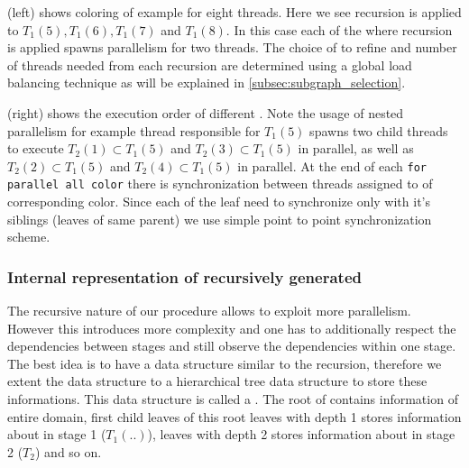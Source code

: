       (left) shows \DTWO coloring of \STEX example for eight threads. Here we see recursion is applied to \levelGroups $T_1(5),T_1(6),T_1(7)$ and $T_1(8)$. In this case each of the \levelGroups where recursion is applied spawns parallelism for two threads. The choice of \levelGroups to refine and number of threads needed from each recursion are determined using a global load balancing technique as will be explained in \cref{subsec:subgraph_selection}.
     
       (right) shows the execution order of different \levelGroups. Note the usage of nested parallelism \ie for example thread responsible for $T_1(5)$ spawns two child threads to execute $T_2(1) \subset T_1(5)$ and $T_2(3) \subset T_1(5)$ in parallel, as well as $T_2(2) \subset T_1(5)$ and $T_2(4) \subset T_1(5)$ in parallel. At the end of each {\tt for parallel all color} there is synchronization between threads assigned to \levelGroup of corresponding color. Since each of the leaf need to synchronize only with it's siblings (leaves of same parent)  we use simple point to point synchronization scheme. 
          
       
	\subsubsection{Internal representation of recursively generated \boldmath{\levelGroups}} \label{subsec:level_tree}
	The recursive nature of our procedure allows to exploit more parallelism. However this introduces more complexity and one has to additionally respect the dependencies between stages and still observe the dependencies within one stage. The best idea is to have a data structure similar to the recursion, therefore we extent the \levelPtr data structure to a hierarchical tree data structure to store these informations. This data structure is called a \levelTree. The root of \levelTree contains information of entire domain, first child leaves of this root \ie leaves with depth 1 stores information about \levelGroups in stage 1 ($T_1(..)$), leaves with depth 2 stores information about \levelGroups in stage 2 ($T_2$) and so on. 
	
